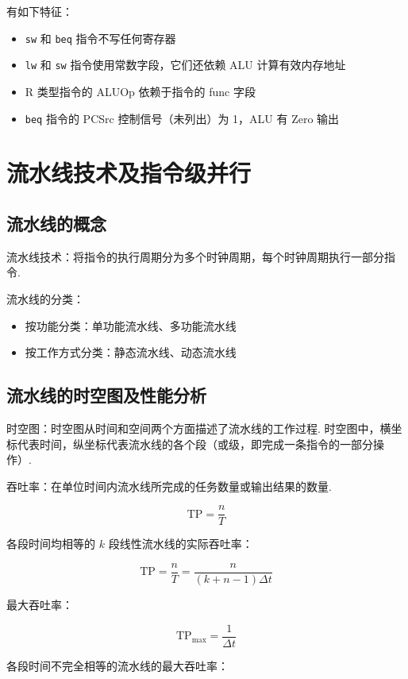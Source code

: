 \documentclass[cn, hazy, blue, normal, 12pt]{elegantnote}
\begin{document}
有如下特征：

\begin{itemize}
    \item \lstinline{sw} 和 \lstinline{beq} 指令不写任何寄存器
    \item \lstinline{lw} 和 \lstinline{sw} 指令使用常数字段，它们还依赖 ALU 计算有效内存地址
    \item R 类型指令的 ALUOp 依赖于指令的 func 字段
    \item \lstinline{beq} 指令的 PCSrc 控制信号（未列出）为 1，ALU 有 Zero 输出
\end{itemize}

\section{流水线技术及指令级并行}

\subsection{流水线的概念}

流水线技术：将指令的执行周期分为多个时钟周期，每个时钟周期执行一部分指令.

流水线的分类：

\begin{itemize}
    \item 按功能分类：单功能流水线、多功能流水线
    \item 按工作方式分类：静态流水线、动态流水线
\end{itemize}

\subsection{流水线的时空图及性能分析}

时空图：时空图从时间和空间两个方面描述了流水线的工作过程. 时空图中，横坐标代表时间，纵坐标代表流水线的各个段（或级，即完成一条指令的一部分操作）.

吞吐率：在单位时间内流水线所完成的任务数量或输出结果的数量.

$$
    \text{TP} = \frac{n}{T}
$$

各段时间均相等的 $k$ 段线性流水线的实际吞吐率：

$$
    \text{TP} = \frac{n}{T} = \frac{n}{(k+n-1)\Delta t}
$$

最大吞吐率：

$$
    \text{TP}_\text{max} = \frac{1}{\Delta t}
$$

各段时间不完全相等的流水线的最大吞吐率：
\end{document}

